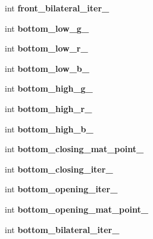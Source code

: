 \begin{DoxyCompactItemize}
int {\bfseries front\+\_\+bilateral\+\_\+iter\+\_\+}
\item 
\mbox{\label{classBase__class_ac34dae2ec32d35a295daa2a154d8ebc2}} 
int {\bfseries bottom\+\_\+low\+\_\+g\+\_\+}
\item 
\mbox{\label{classBase__class_a5577fab7b6d2905b1077d231a9427c78}} 
int {\bfseries bottom\+\_\+low\+\_\+r\+\_\+}
\item 
\mbox{\label{classBase__class_a9f15b22c0795cd5c3321cbb6a319c852}} 
int {\bfseries bottom\+\_\+low\+\_\+b\+\_\+}
\item 
\mbox{\label{classBase__class_a87ec3d96e723540665817ed9393d39f2}} 
int {\bfseries bottom\+\_\+high\+\_\+g\+\_\+}
\item 
\mbox{\label{classBase__class_a0dd97c1db7d7466db46a066a5a94c6f5}} 
int {\bfseries bottom\+\_\+high\+\_\+r\+\_\+}
\item 
\mbox{\label{classBase__class_a15b47c73142453acc22e8ef5fb7a4c31}} 
int {\bfseries bottom\+\_\+high\+\_\+b\+\_\+}
\item 
\mbox{\label{classBase__class_ab8bf6aeb0e7e35cc2cbb78c748161dcd}} 
int {\bfseries bottom\+\_\+closing\+\_\+mat\+\_\+point\+\_\+}
\item 
\mbox{\label{classBase__class_af1aed74bec81e65fbc49f508478d9402}} 
int {\bfseries bottom\+\_\+closing\+\_\+iter\+\_\+}
\item 
\mbox{\label{classBase__class_a26ad84dbcddebb9bfa86c60e20d420c4}} 
int {\bfseries bottom\+\_\+opening\+\_\+iter\+\_\+}
\item 
\mbox{\label{classBase__class_ade092108e623d30416d602cd5cae744f}} 
int {\bfseries bottom\+\_\+opening\+\_\+mat\+\_\+point\+\_\+}
\item 
\mbox{\label{classBase__class_a39d5fecdbca5b67275c5190e545b84d6}} 
int {\bfseries bottom\+\_\+bilateral\+\_\+iter\+\_\+}
\item 

\end{DoxyCompactItemize}
